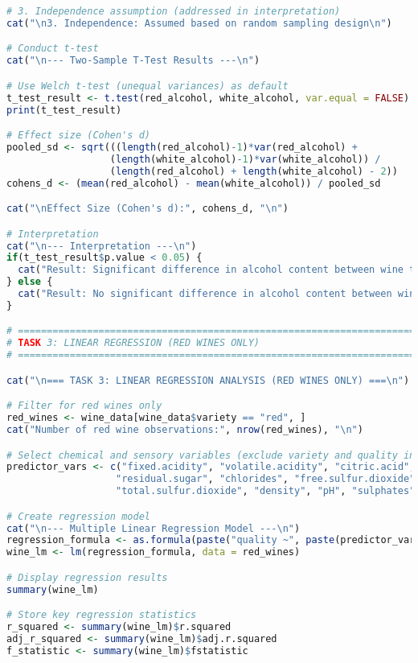 \begin{lstlisting}[language=R, caption=Complete Wine Analysis R Script, breaklines=true]
# 3. Independence assumption (addressed in interpretation)
cat("\n3. Independence: Assumed based on random sampling design\n")

# Conduct t-test
cat("\n--- Two-Sample T-Test Results ---\n")

# Use Welch t-test (unequal variances) as default
t_test_result <- t.test(red_alcohol, white_alcohol, var.equal = FALSE)
print(t_test_result)

# Effect size (Cohen's d)
pooled_sd <- sqrt(((length(red_alcohol)-1)*var(red_alcohol) + 
                  (length(white_alcohol)-1)*var(white_alcohol)) / 
                  (length(red_alcohol) + length(white_alcohol) - 2))
cohens_d <- (mean(red_alcohol) - mean(white_alcohol)) / pooled_sd

cat("\nEffect Size (Cohen's d):", cohens_d, "\n")

# Interpretation
cat("\n--- Interpretation ---\n")
if(t_test_result$p.value < 0.05) {
  cat("Result: Significant difference in alcohol content between wine types (p < 0.05)\n")
} else {
  cat("Result: No significant difference in alcohol content between wine types (p ≥ 0.05)\n")
}

# =============================================================================
# TASK 3: LINEAR REGRESSION (RED WINES ONLY)
# =============================================================================

cat("\n=== TASK 3: LINEAR REGRESSION ANALYSIS (RED WINES ONLY) ===\n")

# Filter for red wines only
red_wines <- wine_data[wine_data$variety == "red", ]
cat("Number of red wine observations:", nrow(red_wines), "\n")

# Select chemical and sensory variables (exclude variety and quality initially)
predictor_vars <- c("fixed.acidity", "volatile.acidity", "citric.acid", 
                   "residual.sugar", "chlorides", "free.sulfur.dioxide", 
                   "total.sulfur.dioxide", "density", "pH", "sulphates", "alcohol")

# Create regression model
cat("\n--- Multiple Linear Regression Model ---\n")
regression_formula <- as.formula(paste("quality ~", paste(predictor_vars, collapse = " + ")))
wine_lm <- lm(regression_formula, data = red_wines)

# Display regression results
summary(wine_lm)

# Store key regression statistics
r_squared <- summary(wine_lm)$r.squared
adj_r_squared <- summary(wine_lm)$adj.r.squared
f_statistic <- summary(wine_lm)$fstatistic


\end{lstlisting}
